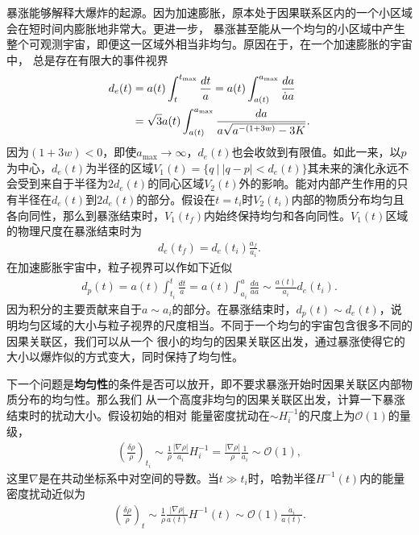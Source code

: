 暴涨能够解释大爆炸的起源。因为加速膨胀，原本处于因果联系区内的一个小区域会在短时间内膨胀地非常大。更进一步，
暴涨甚至能从一个均匀的小区域中产生整个可观测宇宙，即便这一区域外相当非均匀。原因在于，在一个加速膨胀的宇宙中，
总是存在有限大的事件视界
\begin{align}
    d_{e}(t) &= a(t)\int_t^{t_{\text{max}}} \frac{dt}{a}
    =a(t)\int_{a(t)}^{a_{\text{max}}} \frac{da}{\dot{a}a}\notag \\
    &= \sqrt{3}a(t)\int_{a(t)}^{a_{\text{max}}}
    \frac{da}{a\sqrt{a^{-(1+3w)}-3K}}.
\end{align}
因为${\left(1+3w\right)}<0$，即使$a_{\text{max}}\rightarrow
\infty$，$d_{e}(t)$也会收敛到有限值。如此一来，以$
p$为中心，$d_{e}(t)$为半径的区域$V_1(t)=\{q\ |\
|q-p|<d_{e}(t)\}$其未来的演化永远不会受到来自于半径为$2d_{e}(t)$的同心区域$V_2(t)$外的影响。能对内部产生作用的只有半径在$d_{e}(t)$到$2d_{e}(t)$的部分。假设在$t=t_{i}$时$V_2(t_{i})$内部的物质分布均匀且各向同性，那么到暴涨结束时，$V_1(t_{f})$内始终保持均匀和各向同性。$V_1(t)$区域的物理尺度在暴涨结束时为
\begin{align}
  d_{e}(t_{f})=d_e(t_{i}) \frac{a_{f}}{a_{i}}.
\end{align}
在加速膨胀宇宙中，粒子视界可以作如下近似
\begin{align}
  d_{p}(t) =a(t)\int_{t_{i}}^{t} \frac{dt}{a}=a(t)\int_{a_{i}}^{a}
  \frac{da}{\dot{a}a}\sim \frac{a(t)}{a_{i}}d_{e}(t_i). 
\end{align}
因为积分的主要贡献来自于$a\sim a_{i}$的部分。在暴涨结束时，$d_{p}(t)\sim
d_{e}(t)$，说明均匀区域的大小与粒子视界的尺度相当。不同于一个均匀的宇宙包含很多不同的因果关联区，我们可以从一个
很小的均匀的因果关联区出发，通过暴涨使得它的大小以爆炸似的方式变大，同时保持了均匀性。

下一个问题是\textbf{均匀性}的条件是否可以放开，即不要求暴涨开始时因果关联区内部物质分布的均匀性。那么我们
从一个高度非均匀的因果关联区出发，计算一下暴涨结束时的扰动大小。假设初始的相对
能量密度扰动在$\sim
H_{i}^{-1}$的尺度上为$\mathcal{O}(1)$的量级，
\begin{align}
  {\left(\frac{\delta \rho}{\rho}\right)}_{t_{i}}
  \sim \frac{1}{\rho} \frac{|\nabla\rho|}{a_{i}}H_{i}^{-1}
  =\frac{|\nabla\rho|}{\rho}\frac{1}{\dot{a}_{i}}
  \sim \mathcal{O}(1),
\end{align}
这里$\nabla$是在共动坐标系中对空间的导数。当$t\gg
t_{i}$时，哈勃半径$H^{-1}(t)$内的能量密度扰动近似为
\begin{align}
  \label{eq:relative-energy-density-perturbation}
  {\left(\frac{\delta\rho}{\rho}\right)}_{t}
  \sim \frac{1}{\rho} \frac{|\nabla\rho|}{a(t)}H^{-1}(t)
  \sim \mathcal{O}(1) \frac{\dot{a}_{i}}{\dot{a}(t)}.
\end{align}

